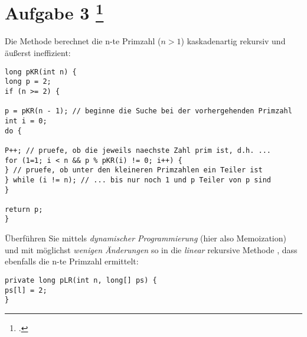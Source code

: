 \documentclass{lehramt-informatik-aufgabe}
\begin{document}
\section{Aufgabe 3
\footcite{46115:2017:09}}

Die Methode  berechnet die n-te Primzahl ($n > 1$)
kaskadenartig rekursiv und äußerst ineffizient:

\begin{verbatim}
long pKR(int n) {
long p = 2;
if (n >= 2) {

p = pKR(n - 1); // beginne die Suche bei der vorhergehenden Primzahl
int i = 0;
do {

P++; // pruefe, ob die jeweils naechste Zahl prim ist, d.h. ...
for (1=1; i < n && p % pKR(i) != 0; i++) {
} // pruefe, ob unter den kleineren Primzahlen ein Teiler ist
} while (i != n); // ... bis nur noch 1 und p Teiler von p sind
}

return p;
}
\end{verbatim}

Überführen Sie  mittels \emph{dynamischer
Programmierung} (hier also Memoization) und mit möglichst \emph{wenigen
Änderungen} so in die \emph{linear} rekursive Methode ,
dass  ebenfalls die n-te Primzahl
ermittelt:

\begin{verbatim}
private long pLR(int n, long[] ps) {
ps[l] = 2;
}
\end{verbatim}

\end{document}
